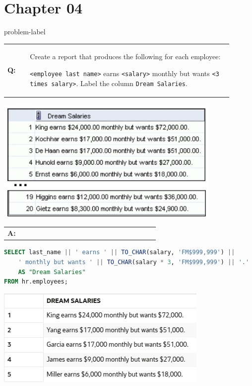 \newpage
\section*{Chapter 04}
{}
\setcounter{problem}{0}

\begin{problem}{}{problem-label}

\begin{tabular}{@{}l p{0.9\linewidth}@{}}
  \textbf{Q:} & Create a report that produces the following for each employee:
  
\texttt{<employee last name>} earns \texttt{<salary>} monthly but wants \texttt{<3 times salary>}. Label the column \texttt{Dream Salaries}.
\end{tabular}

\begin{center}
  \includegraphics[scale=0.8]{images/c4q1.png}
\end{center}

\begin{tabular}{@{}l p{0.9\linewidth}@{}}
  \textbf{A:} & 
\end{tabular}


\begin{lstlisting}[language=SQL]
SELECT last_name || ' earns ' || TO_CHAR(salary, 'FM$999,999') ||
    ' monthly but wants ' || TO_CHAR(salary * 3, 'FM$999,999') || '.' 
    AS "Dream Salaries"
FROM hr.employees;
\end{lstlisting}

\vspace{1em}

\begin{center}
  \includegraphics[scale=0.8]{images/c4a1.png}
\end{center}

\end{problem}

